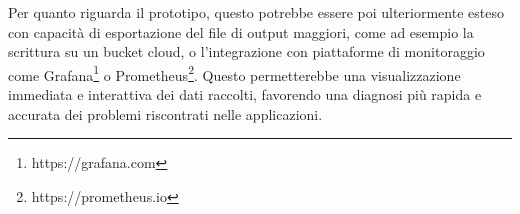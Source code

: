 Per quanto riguarda il prototipo, questo potrebbe essere poi ulteriormente esteso con capacità di esportazione del file di output maggiori, come ad esempio la scrittura su un bucket cloud, o l'integrazione con piattaforme di monitoraggio come Grafana\footnote{https://grafana.com} o Prometheus\footnote{https://prometheus.io}. Questo permetterebbe una visualizzazione immediata e interattiva dei dati raccolti, favorendo una diagnosi più rapida e accurata dei problemi riscontrati nelle applicazioni.
